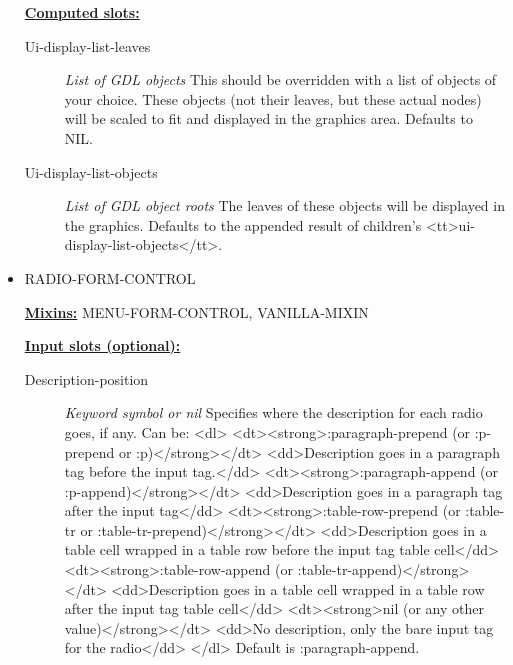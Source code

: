 \documentclass [11pt]{book}
\begin{document}
\begin{itemize}
\begin{description}
\end{description}






\textbf{
\underline{Computed slots:}}

\begin{description}

\item [Ui-display-list-leaves]
\emph{List of GDL objects} This should be overridden with a list of objects of your choice. These objects (not their leaves,
but these actual nodes) will be scaled to fit and displayed in the graphics area. Defaults to NIL.


\item [Ui-display-list-objects]
\emph{List of GDL object roots} The leaves of these objects will be
displayed in the graphics. Defaults to the appended result of children's
<tt>ui-display-list-objects</tt>.


\end{description}







\item {}RADIO-FORM-CONTROL


\textbf{
\underline{Mixins:}} MENU-FORM-CONTROL, VANILLA-MIXIN





\begin{description}

\end{description}








\textbf{
\underline{Input slots (optional):}}

\begin{description}

\item [Description-position]
\emph{Keyword symbol or nil} Specifies where the description for each radio goes, if any.
Can be:
<dl>
<dt><strong>:paragraph-prepend (or :p-prepend or :p)</strong></dt>
<dd>Description goes in a paragraph tag before the input tag.</dd>
<dt><strong>:paragraph-append (or :p-append)</strong></dt>
<dd>Description goes in a paragraph tag after the input tag</dd>
<dt><strong>:table-row-prepend (or :table-tr or :table-tr-prepend)</strong></dt>
<dd>Description goes in a table cell wrapped in a table row before the input tag table cell</dd>
<dt><strong>:table-row-append (or :table-tr-append)</strong></dt>
<dd>Description goes in a table cell wrapped in a table row after the input tag table cell</dd>
<dt><strong>nil (or any other value)</strong></dt>
<dd>No description, only the bare input tag for the radio</dd>
</dl>
Default is :paragraph-append.



\end{description}
\end{itemize}
\end{document}
